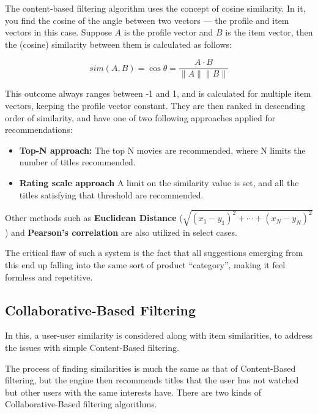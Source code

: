 \documentclass{article}
\begin{document}
\medskip

\noindent The content-based filtering algorithm uses the concept of cosine similarity. In it, you find the cosine of the angle between two vectors — the profile and item vectors in this case. Suppose \( A \) is the profile vector and \( B \) is the item vector, then the (cosine) similarity between them is calculated as follows:

$$ sim(A, B) = \cos{\theta} = \frac{A \cdot B}{\|A\| \|B\|} $$

\noindent This outcome always ranges between -1 and 1, and is calculated for multiple item vectors, keeping the profile vector constant. They are then ranked in descending order of similarity, and have one of two following approaches applied for recommendations:

\begin{itemize}
    \item{\textbf{Top-N approach:} The top N movies are recommended, where N limits the number of titles recommended.}
    \item{\textbf{Rating scale approach} A limit on the similarity value is set, and all the titles satisfying that threshold are recommended.}
\end{itemize}

\noindent Other methods such as \textbf{Euclidean Distance} ($ \sqrt{(x_1 - y_1) ^ 2 + \cdots + (x_N - y_N) ^ 2} $) and \textbf{Pearson’s correlation} are also utilized in select cases.

\medskip

\noindent The critical flaw of such a system is the fact that all suggestions emerging from this end up falling into the same sort of product ``category'', making it feel formless and repetitive.

\subsection{Collaborative-Based Filtering}

In this, a user-user similarity is considered along with item similarities, to address the issues with simple Content-Based filtering.

\medskip

\noindent The process of finding similarities is much the same as that of Content-Based filtering, but the engine then recommends titles that the user has not watched but other users with the same interests have. There are two kinds of Collaborative-Based filtering algorithms.
\end{document}
